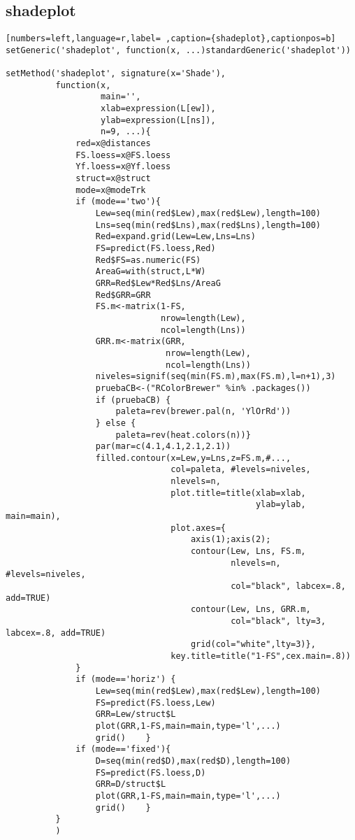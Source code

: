 \subsection{shadeplot}
\label{sec:org2909c7e}
\label{subsec:shadeplot}
\begin{lstlisting}[numbers=left,language=r,label= ,caption={shadeplot},captionpos=b]
setGeneric('shadeplot', function(x, ...)standardGeneric('shadeplot'))

setMethod('shadeplot', signature(x='Shade'),
          function(x,
                   main='',
                   xlab=expression(L[ew]),
                   ylab=expression(L[ns]),
                   n=9, ...){
              red=x@distances
              FS.loess=x@FS.loess
              Yf.loess=x@Yf.loess
              struct=x@struct
              mode=x@modeTrk
              if (mode=='two'){
                  Lew=seq(min(red$Lew),max(red$Lew),length=100)
                  Lns=seq(min(red$Lns),max(red$Lns),length=100)
                  Red=expand.grid(Lew=Lew,Lns=Lns)
                  FS=predict(FS.loess,Red)
                  Red$FS=as.numeric(FS)
                  AreaG=with(struct,L*W)
                  GRR=Red$Lew*Red$Lns/AreaG
                  Red$GRR=GRR
                  FS.m<-matrix(1-FS,
                               nrow=length(Lew),
                               ncol=length(Lns))
                  GRR.m<-matrix(GRR,
                                nrow=length(Lew),
                                ncol=length(Lns))
                  niveles=signif(seq(min(FS.m),max(FS.m),l=n+1),3)
                  pruebaCB<-("RColorBrewer" %in% .packages())
                  if (pruebaCB) {
                      paleta=rev(brewer.pal(n, 'YlOrRd'))
                  } else {
                      paleta=rev(heat.colors(n))}
                  par(mar=c(4.1,4.1,2.1,2.1)) 
                  filled.contour(x=Lew,y=Lns,z=FS.m,#...,
                                 col=paleta, #levels=niveles,
                                 nlevels=n,
                                 plot.title=title(xlab=xlab,
                                                  ylab=ylab, main=main),
                                 plot.axes={
                                     axis(1);axis(2);
                                     contour(Lew, Lns, FS.m,
                                             nlevels=n, #levels=niveles,
                                             col="black", labcex=.8,  add=TRUE)
                                     contour(Lew, Lns, GRR.m,
                                             col="black", lty=3, labcex=.8, add=TRUE)
                                     grid(col="white",lty=3)},
                                 key.title=title("1-FS",cex.main=.8))
              }
              if (mode=='horiz') {
                  Lew=seq(min(red$Lew),max(red$Lew),length=100)
                  FS=predict(FS.loess,Lew)
                  GRR=Lew/struct$L
                  plot(GRR,1-FS,main=main,type='l',...)
                  grid()    }
              if (mode=='fixed'){
                  D=seq(min(red$D),max(red$D),length=100)
                  FS=predict(FS.loess,D)
                  GRR=D/struct$L
                  plot(GRR,1-FS,main=main,type='l',...)
                  grid()    }
          }
          )
\end{lstlisting}
